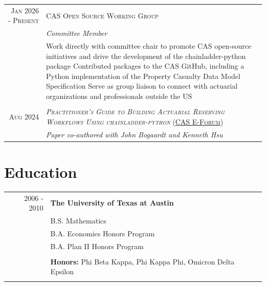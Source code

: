 \documentclass[10pt]{article} %
\begin{document}
\begin{tabular}{r|p{12cm}}
\textsc{Jan 2026 - Present} & \textsc{CAS Open Source Working Group}\\
\textsc{} & \emph{Committee Member}\\
& \footnotesize{
	\textbullet Work directly with committee chair to promote CAS open-source initiatives and drive the development of the chainladder-python package\newline
	\textbullet Contributed packages to the CAS GitHub, including a Python implementation of the Property Casualty Data Model 				Specification\newline
	\textbullet Serve as group liaison to connect with actuarial organizations and professionals outside the US
}\\
\multicolumn{2}{c}{} \\

\textsc{Aug 2024} & \textsc{\emph{Practitioner's Guide to Building Actuarial Reserving Workflows Using chainladder-python} (\href{https://eforum.casact.org/article/123379-practitioners-guide-to-building-actuarial-reserving-workflows-using-chain-ladder-python}{CAS E-Forum})}\\
\textsc{} &  \emph{Paper co-authored with John Bogaardt and Kenneth Hsu}\\
\end{tabular}


\section{Education}

\begin{tabular}{rl}	
\textsc{2006 - 2010} & \textbf{The University of Texas at Austin}\\
& B.S. Mathematics	\\
& B.A. Economics Honors Program\\
& B.A. Plan II Honors Program\\
\\
& {\bfseries Honors:  } Phi Beta Kappa, Phi Kappa Phi, Omicron Delta Epsilon\\
&\\
\end{tabular}
\end{document}
